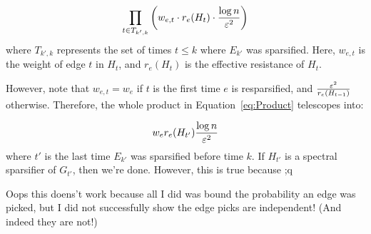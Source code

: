 \documentclass[12pt]{article}
\begin{document}
\begin{align}
\prod_{t \in T_{k', k}}  \left(w_{e, t} \cdot r_e(H_t) \cdot \frac{\log
n}{\varepsilon^2}\right)
\label{eq:Product}
\end{align}
where $T_{k', k}$ represents the set of times $t \leq k$ where $E_{k'}$ was
sparsified. Here, $w_{e,t}$ is the weight of edge $t$ in $H_t$, and
$r_e(H_t)$ is the effective resistance of $H_t$.

However, note that $w_{e,t} = w_e$ if $t$ is the first time $e$ is
resparsified, and $\frac{\varepsilon^2}{r_e(H_{t-1})}$ otherwise. Therefore,
the whole product in Equation~\eqref{eq:Product} telescopes into:

\begin{align}
w_e r_e(H_{t'}) \frac{\log n}{\varepsilon^2}
\label{eq:SimplifiedProduct}
\end{align}
where $t'$ is the last time $E_{k'}$ was sparsified before time $k$.
If $H_{t'}$ is a spectral sparsifier of $G_{t'}$, then we're done.
However, this is true because ;q

Oops this doens't work because all I did was bound the probability an
edge was picked, but I did not successfully show the edge picks are
independent! (And indeed they are not!)
\end{document}
